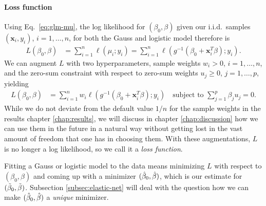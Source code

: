 \paragraph{Loss function}
Using Eq.\ \eqref{eq:glm-mu}, the log likelihood for $(\beta_0, \beta)$ given our i.i.d.\ samples 
$(\mathbf{x}_i, y_i)$, $i = 1, \ldots, n$, for both the Gauss and logistic model therefore is
\begin{align}
    L(\beta_0, \beta) &= \sum_{i=1}^n \ell(\mu_i; y_i) 
    = \sum_{i=1}^n \ell\left( g^{-1}\left( \beta_0 + \mathbf{x}_i^T \beta \right); y_i \right).
\end{align}
We can augment $L$ with two hyperparameters, sample weights $w_i > 0$, $i = 1, \ldots, n$, and the 
zero-sum constraint with respect to zero-sum weights $u_j \geq 0$, $j = 1, \ldots, p$, yielding 
\begin{align} \label{eq:loss-glm-no-lasso}
    L(\beta_0, \beta) &= \sum_{i=1}^n w_i \ell\left( g^{-1}\left( \beta_0 + \mathbf{x}_i^T \beta \right); 
    y_i \right) \quad \text{subject to } \sum_{j=1}^p \beta_j u_j = 0.
\end{align}
While we do not deviate from the default value $1/n$ for the sample weights in the results chapter 
\ref{chap:results}, we will discuss in chapter \ref{chap:discussion} how we can use them in the 
future in a natural way without getting lost in the vast amount of freedom that one has in 
choosing them. 
With these augmentations, $L$ is no longer a log likelihood, so we call it a \textit{loss function}.

Fitting a Gauss or logistic model to the data means minimizing $L$ with respect to 
$(\beta_0, \beta)$ and coming up with a minimizer $(\hat{\beta}_0, \hat{\beta})$, which is our estimate for 
$(\tilde{\beta}_0, \tilde{\beta})$. Subsection \ref{subsec:elastic-net} will deal with the question how we can 
make $(\hat{\beta}_0, \hat{\beta})$ a \textit{unique} minimizer.

